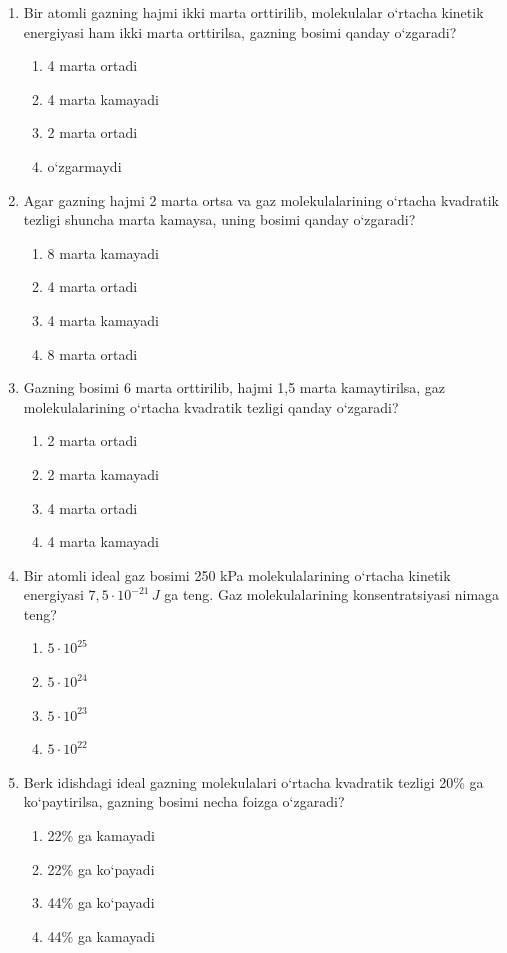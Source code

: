 \begin{enumerate}
\item Bir atomli gazning hajmi ikki marta orttirilib, molekulalar o‘rtacha kinetik energiyasi ham ikki marta orttirilsa, gazning bosimi qanday o‘zgaradi?
\begin{enumerate}[label=\Alph*)]
\item 4 marta ortadi
\item 4 marta kamayadi
\item 2 marta ortadi
\item o‘zgarmaydi
\end{enumerate}

\item Agar gazning hajmi 2 marta ortsa va gaz molekulalarining o‘rtacha kvadratik tezligi shuncha marta kamaysa, uning bosimi qanday o‘zgaradi?
\begin{enumerate}[label=\Alph*)]
\item 8 marta kamayadi
\item 4 marta ortadi
\item 4 marta kamayadi
\item 8 marta ortadi
\end{enumerate}

\item Gazning bosimi 6 marta orttirilib, hajmi 1,5 marta kamaytirilsa, gaz molekulalarining o‘rtacha kvadratik tezligi qanday o‘zgaradi?
\begin{enumerate}[label=\Alph*)]
\item 2 marta ortadi
\item 2 marta kamayadi
\item 4 marta ortadi
\item 4 marta kamayadi
\end{enumerate}

\item Bir atomli ideal gaz bosimi 250 kPa molekulalarining o‘rtacha kinetik energiyasi $7,5 \cdot 10^{-21} \, J$ ga teng. Gaz molekulalarining konsentratsiyasi nimaga teng?
\begin{enumerate}[label=\Alph*)]
\item $5 \cdot 10^{25}$
\item $5 \cdot 10^{24}$
\item $5 \cdot 10^{23}$
\item $5 \cdot 10^{22}$
\end{enumerate}

\item Berk idishdagi ideal gazning molekulalari o‘rtacha kvadratik tezligi 20\% ga ko‘paytirilsa, gazning bosimi necha foizga o‘zgaradi?
\begin{enumerate}[label=\Alph*)]
\item 22\% ga kamayadi
\item 22\% ga ko‘payadi
\item 44\% ga ko‘payadi
\item 44\% ga kamayadi
\end{enumerate}


\end{enumerate}

